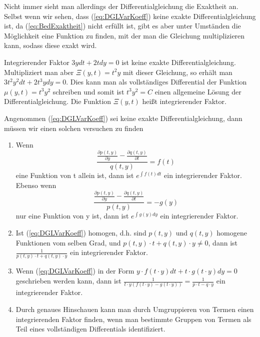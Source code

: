 Nicht immer sieht man allerdings der Differentialgleichung die Exaktheit an.
Selbst wenn wir sehen, dass (\ref{eq:DGLVarKoeff}) keine exakte
Differentialgleichung ist, da (\ref{eq:BedExaktheit}) nicht erfüllt ist, gibt
es aber unter Umständen die Möglichkeit eine Funktion zu finden, mit der man
die Gleichung multiplizieren kann, sodass diese exakt wird. 
\begin{note}{Integrierender Faktor}
  $3ydt+2tdy=0$ ist keine exakte Differentialgleichung. Multipliziert man aber
  $\Xi(y,t)=t^2y$ mit dieser Gleichung, so erhält man $3t^2y^2dt+2t^3ydy=0$.
  Dies kann man als vollständiges Differential der Funktion $\mu(y,t)=t^3y^2$
  schreiben und somit ist $t^3y^2=C$ einen allgemeine Lösung der
  Differentialgleichung. Die Funktion $\Xi(y,t)$ hei{\ss}t integrierender Faktor.
\end{note}
Angenommen (\ref{eq:DGLVarKoeff}) sei keine exakte Differentialgleichung, 
dann müssen wir einen solchen versuchen zu finden
\begin{enumerate}
    \item Wenn 
    \[\frac{\frac{\partial p(t,y)}{\partial y}-\frac{\partial q(t,y)}{\partial t}}{q(t,y)}=f(t)\] 
    eine Funktion von t allein ist, dann ist $e^{\int f(t)dt}$ ein integrierender Faktor. 
    Ebenso wenn
    \[\frac{\frac{\partial p(t,y)}{\partial y}-\frac{\partial q(t,y)}{\partial t}}{p(t,y)}=-g(y)\]
    nur eine Funktion von y ist, dann ist $e^{\int g(y)dy}$ ein integrierender Faktor.
    \item Ist (\ref{eq:DGLVarKoeff}) homogen, d.h. sind $p(t,y)$ und $q(t,y)$
      homogene Funktionen vom selben Grad, und $p(t,y)\cdot t+q(t,y)\cdot y\ne
      0$, dann ist $\frac{1}{p(t,y)\cdot t+q(t,y)\cdot y}$ ein integrierender
      Faktor.
    \item Wenn (\ref{eq:DGLVarKoeff}) in der Form $y\cdot f(t\cdot y)dt+t\cdot g(t\cdot y)dy=0$
    geschrieben werden kann, dann ist $\frac{1}{t\cdot y(f(t\cdot y)-g(t\cdot y))}=\frac{1}{p\cdot t-q\cdot y}$ ein integrierender Faktor.
    \item Durch genaues Hinschauen kann man durch Umgruppieren von Termen einen
      integrierenden Faktor finden, wenn man bestimmte Gruppen von Termen als
      Teil eines vollständigen Differentials identifiziert.
\end{enumerate}
